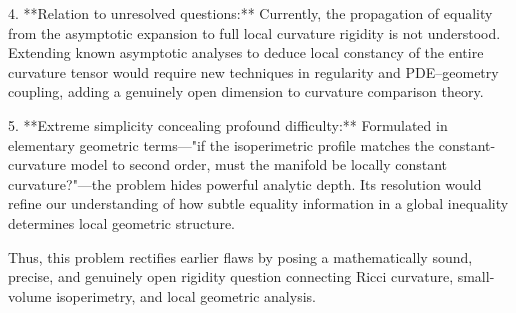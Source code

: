 4. **Relation to unresolved questions:**  
   Currently, the propagation of equality from the asymptotic expansion to full local curvature rigidity is not understood. Extending known asymptotic analyses to deduce local constancy of the entire curvature tensor would require new techniques in regularity and PDE–geometry coupling, adding a genuinely open dimension to curvature comparison theory.

5. **Extreme simplicity concealing profound difficulty:**  
   Formulated in elementary geometric terms—"if the isoperimetric profile matches the constant-curvature model to second order, must the manifold be locally constant curvature?"—the problem hides powerful analytic depth. Its resolution would refine our understanding of how subtle equality information in a global inequality determines local geometric structure.  

Thus, this problem rectifies earlier flaws by posing a mathematically sound, precise, and genuinely open rigidity question connecting Ricci curvature, small-volume isoperimetry, and local geometric analysis.